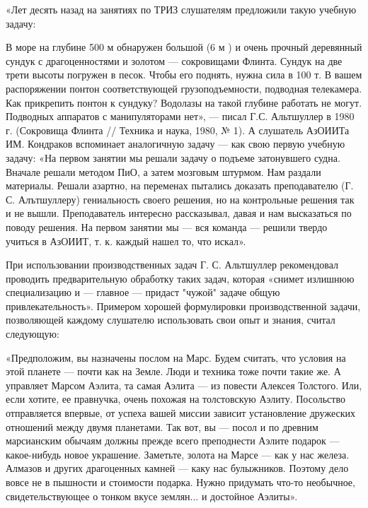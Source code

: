 «Лет  десять назад  на занятиях  по ТРИЗ  слушателям предложили  такую
учебную задачу:



В море  на глубине  500 м  обнаружен большой  (6 м  ) и  очень прочный
деревянный сундук  с драгоценностями  и золотом —  сокровищами Флинта.
Сундук  на две  трети  высоты  погружен в  песок.  Чтобы его  поднять,
нужна  сила  в 100  т.  В  вашем распоряжении  понтон  соответствующей
грузоподъемности,  подводная  телекамера.   Как  прикрепить  понтон  к
сундуку?  Водолазы  на  такой  глубине работать  не  могут.  Подводных
аппаратов с  манипуляторами нет»,  — писал Г.С.  Альтшуллер в  1980 г.
(Сокровища Флинта // Техника и наука,  1980, № 1). А слушатель АзОИИТа
ИМ. Кондраков вспоминает аналогичную задачу  — как свою первую учебную
задачу:  «На первом  занятии мы  решали задачу  о подъеме  затонувшего
судна.  Вначале решали  методом  ПиО, а  затем  мозговым штурмом.  Нам
раздали  материалы. Решали  азартно,  на  переменах пытались  доказать
преподавателю  (Г. С.  Алътшуллеру)  гениальность  своего решения,  но
на  контрольные  решения  так  и  не  вышли.  Преподаватель  интересно
рассказывал,  давая и  нам высказаться  по поводу  решения. На  первом
занятии  мы —  вся команда  — решили  твердо учиться  в АзОИИТ,  т. к.
каждый нашел то, что искал».

При использовании производственных задач Г. С. Альтшуллер рекомендовал
проводить  предварительную  обработку  таких  задач,  которая  «снимет
излишнюю  специализацию и  — главное  — придаст  "чужой" задаче  общую
привлекательность».  Примером  хорошей  формулировки  производственной
задачи, позволяющей каждому слушателю использовать свои опыт и знания,
считал следующую:

«Предположим, вы назначены послом на  Марс. Будем считать, что условия
на этой планете — почти как на  Земле. Люди и техника тоже почти такие
же. А  управляет Марсом Аэлита, та  самая Аэлита — из  повести Алексея
Толстого. Или, если хотите, ее правнучка, очень похожая на толстовскую
Аэлиту.  Посольство  отправляется  впервые,  от  успеха  вашей  миссии
зависит установление  дружеских отношений  между двумя  планетами. Так
вот, вы —  посол и по древним марсианским обычаям  должны прежде всего
преподнести Аэлите  подарок — какое-нибудь новое  украшение. Заметьте,
золота  на Марсе  — как  у нас  железа. Алмазов  и других  драгоценных
камней  — каку  нас булыжников.  Поэтому дело  вовсе не  в пышности  и
стоимости подарка. Нужно придумать что-то необычное, свидетельствующее
о тонком вкусе землян... и достойное Аэлиты».

